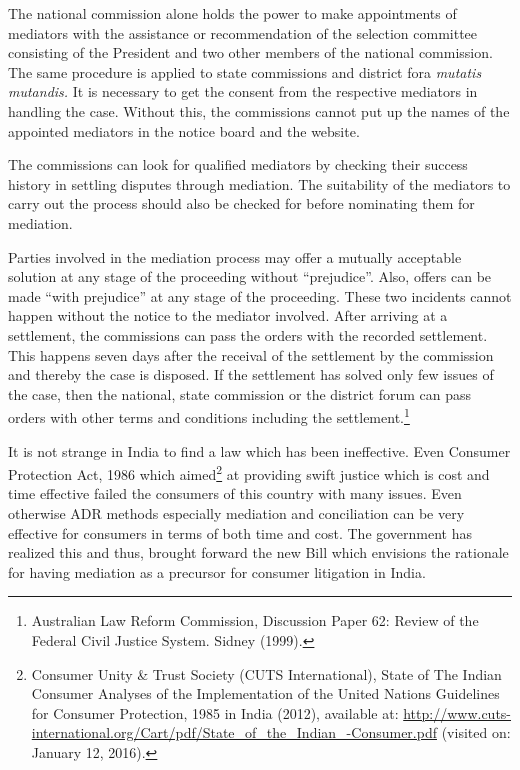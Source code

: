 \begin{multicols}{2}
\noi
The national commission alone holds the power to make appointments of mediators with the
assistance or recommendation of the selection committee consisting of the President and two
other members of the national commission. The same procedure is applied to state commissions
and district fora \textit{mutatis mutandis.} It is necessary to get the consent from the respective
mediators in handling the case. Without this, the commissions cannot put up the names of the
appointed mediators in the notice board and the website.

\noi
The commissions can look for qualified mediators by checking their success history in settling
disputes through mediation. The suitability of the mediators to carry out the process should
also be checked for before nominating them for mediation.

\noi
Parties involved in the mediation process may offer a mutually acceptable solution at any stage
of the proceeding without “prejudice”. Also, offers can be made “with prejudice” at any stage of the proceeding. These two incidents cannot happen without the notice to the mediator
involved. After arriving at a settlement, the commissions can pass the orders with the recorded
settlement. This happens seven days after the receival of the settlement by the commission and
thereby the case is disposed. If the settlement has solved only few issues of the case, then the
national, state commission or the district forum can pass orders with other terms and conditions
including the settlement.\footnote{Australian Law Reform Commission, Discussion Paper 62: Review of the Federal Civil Justice System. Sidney (1999).}


\noi
It is not strange in India to find a law which has been ineffective. Even Consumer Protection
Act, 1986 which aimed\footnote{Consumer Unity \& Trust Society (CUTS International), State of The Indian Consumer Analyses of the Implementation of the United Nations Guidelines for Consumer Protection, 1985 in India (2012), available at: \url{http://www.cuts-international.org/Cart/pdf/State_of_the_Indian_-Consumer.pdf} (visited on: January 12, 2016).} at providing swift justice which is cost and time effective failed the
consumers of this country with many issues. Even otherwise ADR methods especially
mediation and conciliation can be very effective for consumers in terms of both time and cost.
The government has realized this and thus, brought forward the new Bill which envisions the
rationale for having mediation as a precursor for consumer litigation in India.
\end{multicols}
	
